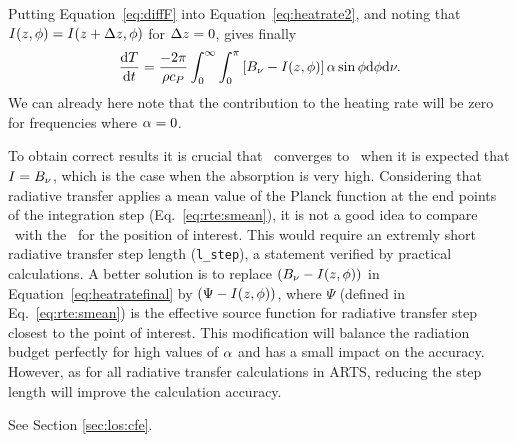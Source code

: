  Putting Equation~\ref{eq:diffF} into Equation~\ref{eq:heatrate2}, and
 noting that
 $I(z,\phi)=I(z+\Delta z,\phi)$
 for $\Delta z=0$,  gives finally
 \begin{equation}
   \label{eq:heatratefinal}
    \frac{\mathrm{d}T}{\mathrm{d}t} = 
        \frac{-2\pi}{\rho c_{P}} \int_0^\infty 
     \int_0^\pi \left[ B_{\nu} -I(z,\phi)
           \right] \alpha \sin\phi \mathrm{d}\phi   \mathrm{d}\nu.
 \end{equation}
 We can already here note that the contribution to the heating rate
 will be zero for frequencies where $\alpha=0$.
 
 To obtain correct results it is crucial that \mpbi\ converges to
 \planckfunc\ when it is expected that $I=B_{\nu}$, which is the
 case when the absorption is very high. Considering that radiative
 transfer applies a mean value of the Planck function at the end
 points of the integration step (Eq.~\ref{eq:rte:smean}), it is not a
 good idea to compare \mpbi\ with the \planckfunc\ for the position of
 interest. This would require an extremly short radiative transfer
 step length (\verb|l_step|), a statement verified by practical
 calculations. A better solution is to replace $(B_{\nu}
 -I(z,\phi))$ in Equation~\ref{eq:heatratefinal} by
 $(\Psi-I(z,\phi))$, where $\Psi$ (defined in
 Eq.~\ref{eq:rte:smean}) is the effective source function for
 radiative transfer step closest to the point of interest. This
 modification will balance the radiation budget perfectly for high
 values of $\alpha$ and has a small impact on the accuracy.
 However, as for all radiative transfer calculations in ARTS, reducing
 the step length will improve the calculation accuracy.
 
 

  \label{sec:rte:cfe}
 
  See Section \ref{sec:los:cfe}.



